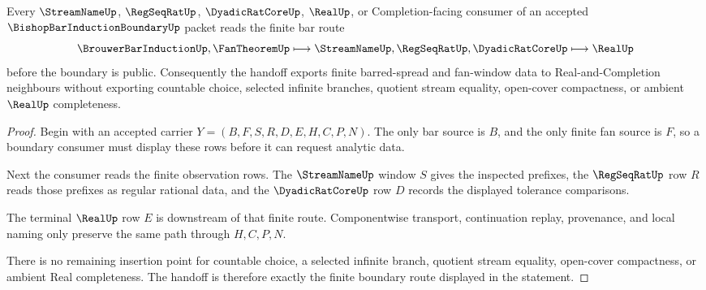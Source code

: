 \begin{theorem}
\label{thm:bishop-bar-induction-boundary-finite-bar-handoff}
Every $\StreamNameUp$, $\RegSeqRatUp$, $\DyadicRatCoreUp$, $\RealUp$, or Completion-facing consumer of an accepted $\BishopBarInductionBoundaryUp$ packet reads the finite bar route
$$
\BrouwerBarInductionUp,\FanTheoremUp \longmapsto \StreamNameUp,\RegSeqRatUp,\DyadicRatCoreUp \longmapsto \RealUp
$$
before the boundary is public. Consequently the handoff exports finite barred-spread and fan-window data to Real-and-Completion neighbours without exporting countable choice, selected infinite branches, quotient stream equality, open-cover compactness, or ambient $\RealUp$ completeness.
\end{theorem}
\begin{proof}
Begin with an accepted carrier $Y=(B,F,S,R,D,E,H,C,P,N)$. The only bar source is $B$, and the only finite fan source is $F$, so a boundary consumer must display these rows before it can request analytic data.

Next the consumer reads the finite observation rows. The $\StreamNameUp$ window $S$ gives the inspected prefixes, the $\RegSeqRatUp$ row $R$ reads those prefixes as regular rational data, and the $\DyadicRatCoreUp$ row $D$ records the displayed tolerance comparisons.

The terminal $\RealUp$ row $E$ is downstream of that finite route. Componentwise transport, continuation replay, provenance, and local naming only preserve the same path through $H,C,P,N$.

There is no remaining insertion point for countable choice, a selected infinite branch, quotient stream equality, open-cover compactness, or ambient Real completeness. The handoff is therefore exactly the finite boundary route displayed in the statement.
\end{proof}



